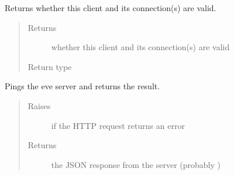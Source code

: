 \documentclass[letterpaper,10pt,english]{sphinxmanual}
\begin{document}
\begin{fulllineitems}
\begin{fulllineitems}
\end{fulllineitems}


\begin{fulllineitems}
\label{\detokenize{autoapi/pine/client/client/index:pine.client.client.EveClient.is_valid}}
\sphinxAtStartPar
Returns whether this client and its connection(s) are valid.
\begin{quote}\begin{description}
\item[{Returns}] \leavevmode
\sphinxAtStartPar
whether this client and its connection(s) are valid

\item[{Return type}] \leavevmode
\sphinxAtStartPar
{}

\end{description}\end{quote}

\end{fulllineitems}


\begin{fulllineitems}
\label{\detokenize{autoapi/pine/client/client/index:pine.client.client.EveClient.ping}}
\sphinxAtStartPar
Pings the eve server and returns the result.
\begin{quote}\begin{description}
\item[{Raises}] \leavevmode
\sphinxAtStartPar
{\hyperref[\detokenize{autoapi/pine/client/exceptions/index:pine.client.exceptions.PineClientHttpException}]{}} \textendash{} if the HTTP request returns an error

\item[{Returns}] \leavevmode
\sphinxAtStartPar
the JSON response from the server (probably )


\end{description}
\end{quote}
\end{fulllineitems}
\end{fulllineitems}
\end{document}
